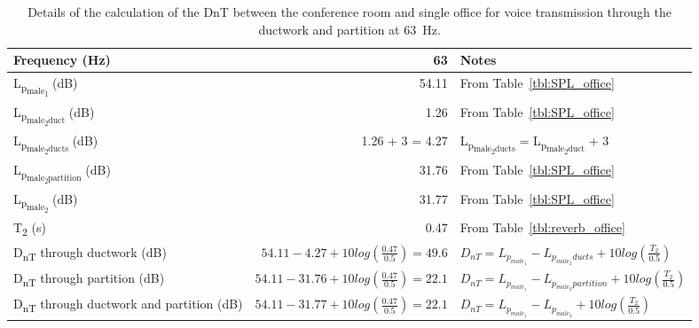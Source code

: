\begin{sidewaystable}[htbp]
	\caption{Details of the calculation of the DnT between the conference room and single office for voice transmission through the ductwork and partition at 63~Hz.}
	\label{tbl:DnT_example}
	\centering
	\begin{tabular}{@{}lrl@{}}
		\toprule
		Frequency (Hz) & 63 & Notes \\ \midrule
		L\textsubscript{p\textsubscript{male\textsubscript{1}}} (dB) & 54.11 & From Table~\ref{tbl:SPL_office} \\
		L\textsubscript{p\textsubscript{male\textsubscript{2}duct}} (dB) & 1.26 & From Table~\ref{tbl:SPL_office} \\
		L\textsubscript{p\textsubscript{male\textsubscript{2}ducts}} (dB) & 1.26 + 3 = 4.27 & L\textsubscript{p\textsubscript{male\textsubscript{2}ducts}} = L\textsubscript{p\textsubscript{male\textsubscript{2}duct}} + 3 \\
		L\textsubscript{p\textsubscript{male\textsubscript{2}partition}} (dB) & 31.76 & From Table~\ref{tbl:SPL_office} \\
		L\textsubscript{p\textsubscript{male\textsubscript{2}}} (dB) & 31.77 & From Table~\ref{tbl:SPL_office} \\
		T\textsubscript{2} (s) & 0.47 & From Table~\ref{tbl:reverb_office} \\
		D\textsubscript{nT} through ductwork (dB) & $54.11 - 4.27 + 10 log \left(\frac{0.47}{0.5}\right) = 49.6$ & $D_{nT} = L_{p_{male_1}} - L_{p_{male_2}ducts} + 10 log \left(\frac{T_2}{0.5}\right)$ \\
		D\textsubscript{nT} through partition (dB) & $54.11 - 31.76 + 10 log \left(\frac{0.47}{0.5}\right) = 22.1$ & $D_{nT} = L_{p_{male_1}} - L_{p_{male_2}partition} + 10 log \left(\frac{T_2}{0.5}\right)$ \\
		D\textsubscript{nT} through ductwork and partition (dB) & $54.11 - 31.77 + 10 log \left(\frac{0.47}{0.5}\right) = 22.1$ & $D_{nT} = L_{p_{male_1}} - L_{p_{male_2}} + 10 log \left(\frac{T_2}{0.5}\right)$ \\ \bottomrule
	\end{tabular}
\end{sidewaystable}